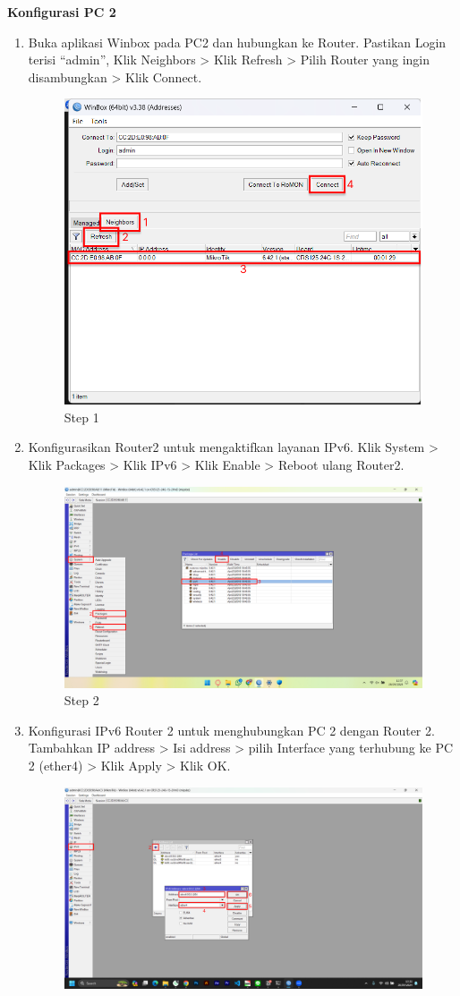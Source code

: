 \begin{center}
    \textbf{Konfigurasi PC 2}
    \begin{enumerate}
        \item Buka aplikasi Winbox pada PC2 dan hubungkan ke Router. Pastikan Login terisi “admin”, Klik Neighbors > Klik Refresh > Pilih Router yang ingin disambungkan > Klik Connect.
        \begin{figure}[H]
			\centering
			\includegraphics[width=0.5\linewidth]{P5/img/pc2/Step 1.png}
			\caption{Step 1}
			\label{fig:Step 1(PC 2)}
		\end{figure}
        \item Konfigurasikan Router2 untuk mengaktifkan layanan IPv6. Klik System > Klik Packages > Klik IPv6 > Klik Enable > Reboot ulang Router2.
        \begin{figure}[H]
			\centering
			\includegraphics[width=0.5\linewidth]{P5/img/pc2/Step 2.png}
			\caption{Step 2}
			\label{fig:Step 2(PC 2)}
        \end{figure}
        \item Konfigurasi IPv6 Router 2 untuk menghubungkan PC 2 dengan Router 2. Tambahkan IP address > Isi address > pilih Interface yang terhubung ke PC 2 (ether4) > Klik Apply > Klik OK.
        \begin{figure}[H]
			\centering
			\includegraphics[width=0.8\linewidth]{P5/img/pc2/Step 3.png}

\end{figure}
\end{enumerate}
\end{center}
